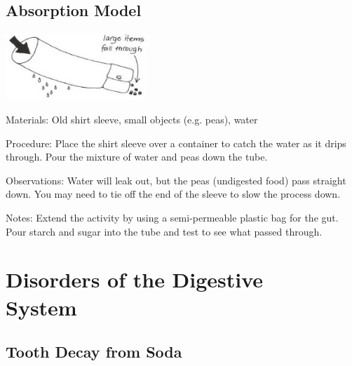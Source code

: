 \begin{multicols}{2}
\subsection{Absorption Model} %

\begin{center}
\includegraphics[width=0.4\textwidth]{./img/vso/absorption-model.jpg}
\end{center}

\begin{description*}
\item[Materials:]{Old shirt sleeve, small objects (e.g. peas), water}
\item[Procedure:]{Place the shirt sleeve over a container to catch the water as it drips
through. Pour the mixture of water and peas down the tube. }
\item[Observations:]{Water
will leak out, but the peas (undigested food) pass straight down. You
may need to tie off the end of the sleeve to slow the process down.}
\item[Notes:]{Extend the activity by using a semi-permeable plastic bag for the gut.
Pour starch and sugar into the tube and test to see what passed
through.}
\end{description*}


\section*{Disorders of the Digestive \hfill \\ System}


\subsection{Tooth Decay from Soda} %


\end{multicols}
